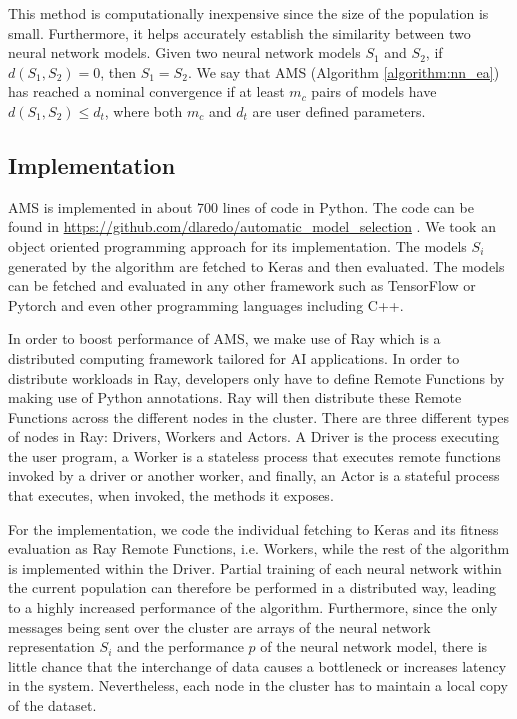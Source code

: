 \documentclass[preprint,12pt]{elsarticle}%
\begin{document}
This method is computationally inexpensive since the size of the population is small. Furthermore, it helps accurately establish the similarity between two neural network models. Given two neural network models $S_1$ and $S_2$, if $d(S_1, S_2) = 0$, then $S_1 = S_2$. We say that AMS (Algorithm \ref{algorithm:nn_ea}) has reached a nominal convergence if at least $m_c$ pairs of models have $d(S_1, S_2) \leq d_t$, where both $m_c$ and $d_t$ are user defined parameters.

\subsection{Implementation}
\label{sec:implementation}

AMS is implemented in about 700 lines of code in Python. The code can be found in \url{https://github.com/dlaredo/automatic_model_selection} \cite{Laredo2019}. We took an object oriented programming approach for its implementation. The models $S_i$ generated by the algorithm are fetched to Keras \cite{keras2015} and then evaluated. The models can be fetched and evaluated in any other framework such as TensorFlow or Pytorch and even other programming languages including C++.

In order to boost performance of AMS, we make use of Ray \cite{Moritz2017} which is a distributed computing framework tailored for AI applications. In order to distribute workloads in Ray, developers only have to define Remote Functions by making use of Python annotations. Ray will then distribute these Remote Functions across the different nodes in the cluster. There are three different types of nodes in Ray: Drivers, Workers and Actors. A Driver is the process executing the user program, a Worker is a stateless process that executes remote functions invoked by a driver or another worker, and finally, an Actor is a stateful process that executes, when invoked, the methods it exposes.

For the implementation, we code the individual fetching to Keras and its fitness evaluation as Ray Remote Functions, i.e. Workers, while the rest of the algorithm is implemented within the Driver. Partial training of each neural network within the current population can therefore be performed in a distributed way, leading to a highly increased performance of the algorithm. Furthermore, since the only messages being sent over the cluster are arrays of the neural network representation $S_i$ and the performance $p$ of the neural network model, there is little chance that the interchange of data causes a bottleneck or increases latency in the system. Nevertheless, each node in the cluster has to maintain a local copy of the dataset.
\end{document}
